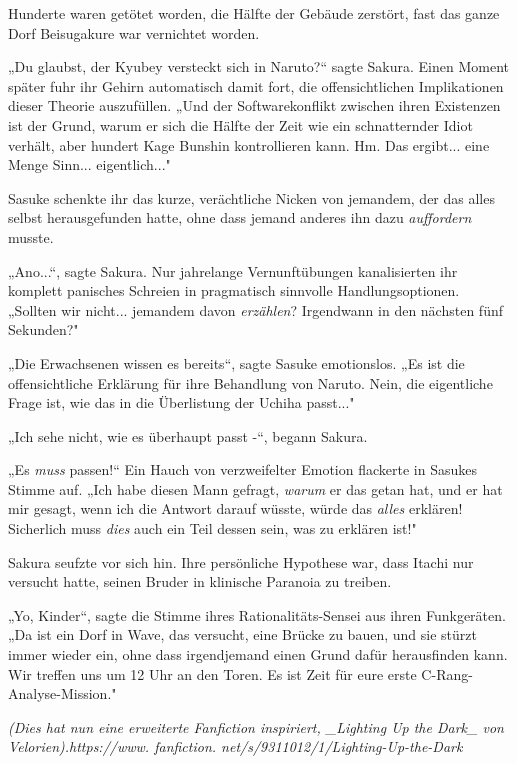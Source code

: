 {Hunderte waren getötet worden, die Hälfte der Gebäude zerstört, fast das ganze Dorf Beisugakure war vernichtet worden.

„Du glaubst, der Kyubey versteckt sich in Naruto?“ sagte Sakura. Einen Moment später fuhr ihr Gehirn automatisch damit fort, die offensichtlichen Implikationen dieser Theorie auszufüllen. „Und der Softwarekonflikt zwischen ihren Existenzen ist der Grund, warum er sich die Hälfte der Zeit wie ein schnatternder Idiot verhält, aber hundert Kage Bunshin kontrollieren kann. Hm. Das ergibt... eine Menge Sinn... eigentlich..."

Sasuke schenkte ihr das kurze, verächtliche Nicken von jemandem, der das alles selbst herausgefunden hatte, ohne dass jemand anderes ihn dazu \emph{auffordern} musste.

„Ano...“, sagte Sakura. Nur jahrelange Vernunftübungen kanalisierten ihr komplett panisches Schreien in pragmatisch sinnvolle Handlungsoptionen. „Sollten wir nicht... jemandem davon \emph{erzählen}? Irgendwann in den nächsten fünf Sekunden?"

„Die Erwachsenen wissen es bereits“, sagte Sasuke emotionslos. „Es ist die offensichtliche Erklärung für ihre Behandlung von Naruto. Nein, die eigentliche Frage ist, wie das in die Überlistung der Uchiha passt..."

„Ich sehe nicht, wie es überhaupt passt -“, begann Sakura.

„Es \emph{muss} passen!“ Ein Hauch von verzweifelter Emotion flackerte in Sasukes Stimme auf. „Ich habe diesen Mann gefragt, \emph{warum} er das getan hat, und er hat mir gesagt, wenn ich die Antwort darauf wüsste, würde das \emph{alles} erklären! Sicherlich muss \emph{dies} auch ein Teil dessen sein, was zu erklären ist!"

Sakura seufzte vor sich hin. Ihre persönliche Hypothese war, dass Itachi nur versucht hatte, seinen Bruder in klinische Paranoia zu treiben.

„Yo, Kinder“, sagte die Stimme ihres Rationalitäts-Sensei aus ihren Funkgeräten. „Da ist ein Dorf in Wave, das versucht, eine Brücke zu bauen, und sie stürzt immer wieder ein, ohne dass irgendjemand einen Grund dafür herausfinden kann. Wir treffen uns um 12 Uhr an den Toren. Es ist Zeit für eure erste C-Rang-Analyse-Mission."

\emph{\emph{(Dies hat nun eine erweiterte Fanfiction inspiriert, \_Lighting} \emph{Up} \emph{the} \emph{Dark\_ von} \emph{Velorien).https://www. fanfiction. net/s/9311012/1/Lighting-Up-the-Dark}}

}
